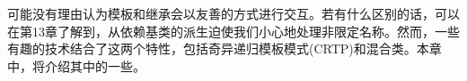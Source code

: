 可能没有理由认为模板和继承会以友善的方式进行交互。若有什么区别的话，可以在第13章了解到，从依赖基类的派生迫使我们小心地处理非限定名称。然而，一些有趣的技术结合了这两个特性，包括奇异递归模板模式(CRTP)和混合类。本章中，将介绍其中的一些。